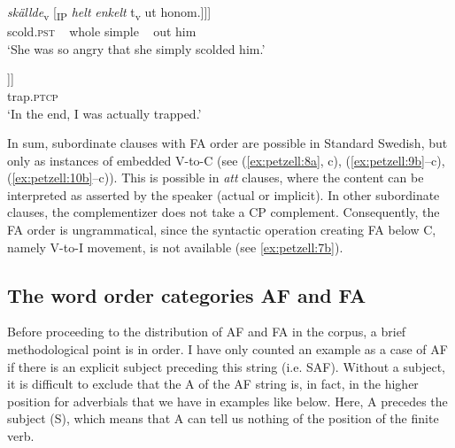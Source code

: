 \documentclass[output=paper,colorlinks,citecolor=brown,draft,draftmode]{langscibook}
\begin{document}
\gll     \textit{{skällde}}\textsubscript{v} [\textsubscript{IP} \textit{{helt}} \textit{{enkelt}} t\textsubscript{v}  ut    honom.]]]  \\
    scold.\textsc{pst} ~ whole simple ~  out  him\\
\glt `She was so angry that she simply scolded him.’  \\


\gll     [\textsubscript{CP}    att [\textsubscript{CP}  jag  \textit{{blev}}\textsubscript{v} [\textsubscript{IP}      \textit{{faktiskt}}  t\textsubscript{v}     \\
          ~ that   ~ I    become.\textsc{pst}   ~ actually ~ \\
\gll     instängd.]]]  \\
    trap.\textsc{ptcp}\\
\glt `In the end, I was actually trapped.’
\z
\z


In sum, subordinate clauses with FA order are possible in Standard Swedish, but only as instances of embedded V-to-C (see (\ref{ex:petzell:8a}, c), (\ref{ex:petzell:9b}–c), (\ref{ex:petzell:10b}–c)). This is possible in \textit{att} clauses, where the content can be interpreted as asserted by the speaker (actual or implicit). In other subordinate clauses, the complementizer does not take a CP complement. Consequently, the FA order is ungrammatical, since the syntactic operation creating FA below C, namely V-to-I movement, is not available (see \ref{ex:petzell:7b}).


\subsection{The word order categories AF and FA}\label{sec:petzell:2.3}


Before proceeding to the distribution of AF and FA in the corpus, a brief methodological point is in order. I have only counted an example as a case of AF if there is an explicit subject preceding this string (i.e. SAF). Without a subject, it is difficult to exclude that the A of the AF string is, in fact, in the higher position for adverbials that we have in examples like  below. Here, A precedes the subject (S), which means that A can tell us nothing of the position of the finite verb.
\end{document}

